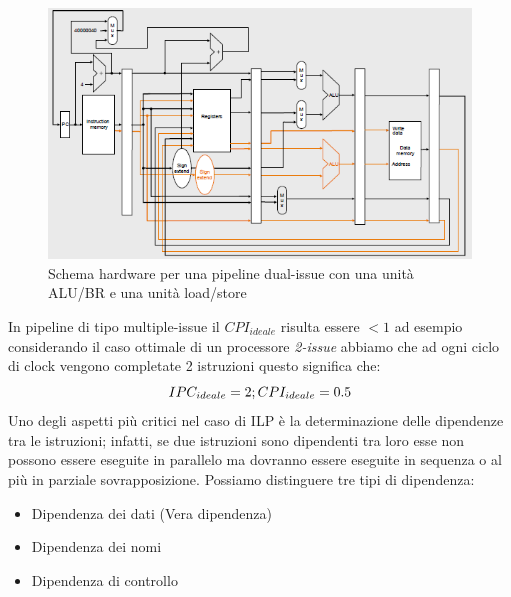 \begin{figure}
\centering
\includegraphics[scale=0.5]{img/dualmips.png}
\caption{Schema hardware per una pipeline dual-issue con una unità ALU/BR e una unità load/store}
\end{figure}
In pipeline di tipo multiple-issue il $CPI_{ideale}$ risulta essere $<1$ ad esempio considerando il caso ottimale di un processore \emph{2-issue} abbiamo che ad ogni ciclo di clock vengono completate 2 istruzioni questo significa che:
$$IPC_{ideale} = 2; \\ CPI_{ideale} = 0.5$$
Uno degli aspetti più critici nel caso di ILP è la determinazione delle dipendenze tra le istruzioni; infatti, se due istruzioni sono dipendenti tra loro esse non possono essere eseguite in parallelo ma dovranno essere eseguite in sequenza o al più in parziale sovrapposizione. Possiamo distinguere tre tipi di dipendenza:
\begin{itemize}
\item Dipendenza dei dati (Vera dipendenza)
\item Dipendenza dei nomi
\item Dipendenza di controllo
\end{itemize}
